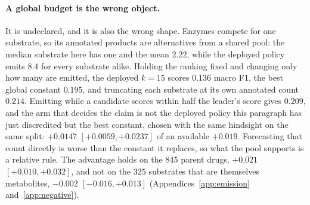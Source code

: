\paragraph{A global budget is the wrong object.} It is undeclared, and it is also the wrong shape.
Enzymes compete for one substrate, so its annotated products are alternatives from a shared pool:
the median substrate here has one and the mean $2.22$, while the deployed policy emits $8.4$ for
every substrate alike. Holding the ranking fixed and changing only how many are emitted, the
deployed $k=15$ scores $0.136$ macro F1, the best global constant $0.195$, and truncating each
substrate at its own annotated count $0.214$. Emitting while a candidate scores within half the
leader's score gives $0.209$, and the arm that decides the claim is not the deployed policy this
paragraph has just discredited but the best constant, chosen with the same hindsight on the same
split: $+0.0147$ $[+0.0059,+0.0237]$ of an available $+0.019$. Forecasting that count directly is
worse than the constant it replaces, so what the pool supports is a relative rule. The advantage
holds on the $845$ parent drugs, $+0.021$ $[+0.010,+0.032]$, and not on the $325$ substrates that
are themselves metabolites, $-0.002$ $[-0.016,+0.013]$ (Appendices~\ref{app:emission}
and~\ref{app:negative}).


